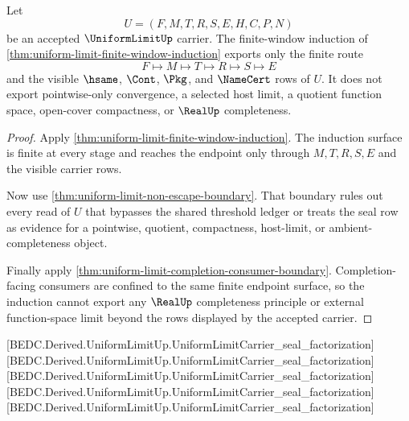 \begin{theorem}
\label{thm:uniform-limit-real-seal-nonescape}
Let
$$
U=(F,M,T,R,S,E,H,C,P,N)
$$
be an accepted $\UniformLimitUp$ carrier. The finite-window induction of \autoref{thm:uniform-limit-finite-window-induction} exports only the finite route
$$
F \longmapsto M \longmapsto T \longmapsto R \longmapsto S \longmapsto E
$$
and the visible $\hsame$, $\Cont$, $\Pkg$, and $\NameCert$ rows of $U$. It does not export pointwise-only convergence, a selected host limit, a quotient function space, open-cover compactness, or $\RealUp$ completeness.
\end{theorem}
\begin{proof}
Apply \autoref{thm:uniform-limit-finite-window-induction}. The induction surface is finite at every stage and reaches the endpoint only through $M,T,R,S,E$ and the visible carrier rows.

Now use \autoref{thm:uniform-limit-non-escape-boundary}. That boundary rules out every read of $U$ that bypasses the shared threshold ledger or treats the seal row as evidence for a pointwise, quotient, compactness, host-limit, or ambient-completeness object.

Finally apply \autoref{thm:uniform-limit-completion-consumer-boundary}. Completion-facing consumers are confined to the same finite endpoint surface, so the induction cannot export any $\RealUp$ completeness principle or external function-space limit beyond the rows displayed by the accepted carrier.
\end{proof}

[BEDC.Derived.UniformLimitUp.UniformLimitCarrier\_seal\_factorization]
[BEDC.Derived.UniformLimitUp.UniformLimitCarrier\_seal\_factorization]
[BEDC.Derived.UniformLimitUp.UniformLimitCarrier\_seal\_factorization]
[BEDC.Derived.UniformLimitUp.UniformLimitCarrier\_seal\_factorization]
[BEDC.Derived.UniformLimitUp.UniformLimitCarrier\_seal\_factorization]

